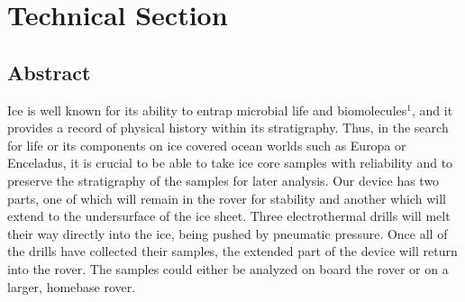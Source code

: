 \documentclass{article}
\begin{document}
\begin{titlepage}
\tableofcontents
\end{titlepage}

\section{Technical Section}
\subsection{Abstract}
Ice is well known for its ability to entrap microbial life and biomolecules$^1$, and it provides a record of physical history within its stratigraphy. Thus, in the search for life or its components on ice covered ocean worlds such as Europa or Enceladus, it is crucial to be able to take ice core samples with reliability and to preserve the stratigraphy of the samples for later analysis. Our device has two parts, one of which will remain in the rover for stability and another which will extend to the undersurface of the ice sheet. Three electrothermal drills will melt their way directly into the ice, being pushed by pneumatic pressure. Once all of the drills have collected their samples, the extended part of the device will return into the rover. The samples could either be analyzed on board the rover or on a larger, homebase rover.
\end{document}
